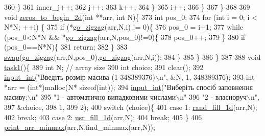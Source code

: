 \begin{DoxyCodeInclude}
{{{{{{{{{{{{360             \}
361             inner\_j++;
362             j++;
363             k++;
364         \}
365         i++;
366     \}
367 \}
368 
369 \textcolor{keywordtype}{void} \hyperlink{main_8c_ad9267778aed4908cc85b34675cb83a50}{zeros\_to\_begin\_2d}(\textcolor{keywordtype}{int} **arr, \textcolor{keywordtype}{int} N)\{
373     \textcolor{keywordtype}{int} pos\_0;
374     \textcolor{keywordflow}{for} (\textcolor{keywordtype}{int} i = 0; i < N*N; ++i) \{
375         \textcolor{keywordflow}{if} (*\hyperlink{main_8c_a136eda0783a1b3202fbf6330967acec0}{go\_zigzag}(arr,N,i) != 0)\{
376             pos\_0 = i+1;
377             \textcolor{keywordflow}{while} (pos\_0<N*N && *\hyperlink{main_8c_a136eda0783a1b3202fbf6330967acec0}{go\_zigzag}(arr,N,pos\_0)!=0)\{
378                 pos\_0++;
379             \}
380             \textcolor{keywordflow}{if} (pos\_0==N*N)\{
381                 \textcolor{keywordflow}{return};
382             \}
383             \hyperlink{main_8c_ad126fa7239be97373c96861adc70b1d3}{swap}(\hyperlink{main_8c_a136eda0783a1b3202fbf6330967acec0}{go\_zigzag}(arr,N,pos\_0),\hyperlink{main_8c_a136eda0783a1b3202fbf6330967acec0}{go\_zigzag}(arr,N,i));
384         \}
385     \}
386 \}
387 
388 \textcolor{keywordtype}{void} \hyperlink{main_8c_afde07648040c326129670547738a0c86}{task1}()\{
389     \textcolor{keywordtype}{int} N; \textcolor{comment}{// array size}
390     \textcolor{keywordtype}{int} choice;
391     clear();
392     \hyperlink{main_8c_a6f453bc035d85e967bd5032eca31a155}{input\_int}(\textcolor{stringliteral}{"Введіть розмір масива (1-348389376)\(\backslash\)n"}, &N, 1, 348389376);
393     \textcolor{keywordtype}{int} *arr = (\textcolor{keywordtype}{int}*)malloc(N* \textcolor{keyword}{sizeof}(\textcolor{keywordtype}{int}));
394     \hyperlink{main_8c_a6f453bc035d85e967bd5032eca31a155}{input\_int}(\textcolor{stringliteral}{"Виберіть спосіб заповнення масиву:\(\backslash\)n"}
395               \textcolor{stringliteral}{"1 - автоматично випадковими числами\(\backslash\)n"}
396               \textcolor{stringliteral}{"2 - власноруч\(\backslash\)n"},
397               &choice,
398               1,
399               2);
400     \textcolor{keywordflow}{switch} (choice)\{
401         \textcolor{keywordflow}{case} 1: \hyperlink{main_8c_a59de3507f445b58bf9f31f121f1dd53e}{rand\_fill\_1d}(arr,N);
402             \textcolor{keywordflow}{break};
403         \textcolor{keywordflow}{case} 2: \hyperlink{main_8c_a754c278f22020e77d09cda28d2e18f4e}{usr\_fill\_1d}(arr,N);
404             \textcolor{keywordflow}{break};
405     \}
406     \hyperlink{main_8c_a954f537fd937eb56b052549a1e3b4be4}{print\_arr\_minmax}(arr,N,find\_minmax(arr,N));
}}}}}}}}}}}}
\end{DoxyCodeInclude}
